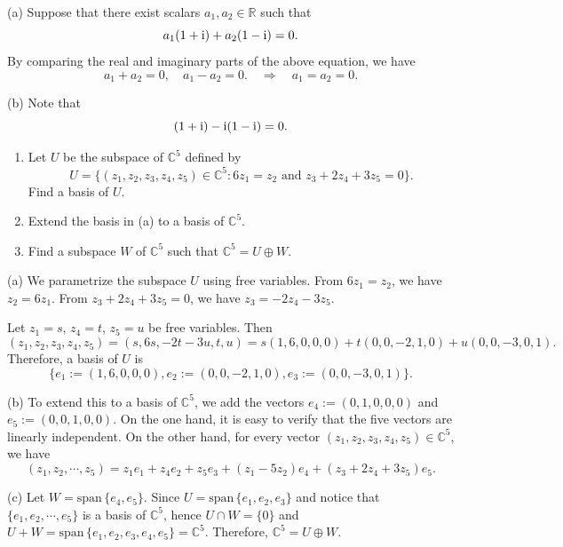 \documentclass{article}
\newcommand{\sspan}{\text{span}\,}
\begin{document}
\begin{solution}
    (a) Suppose that there exist scalars \( a_1, a_2 \in \mathbb{R} \) such that
    \[ a_1 (1 + \mathrm{i}) + a_2 (1 - \mathrm{i}) = 0. \]
    By comparing the real and imaginary parts of the above equation, we have
    \[ a_1+a_2=0,\quad a_1-a_2=0.\quad\Rightarrow\quad a_1=a_2=0. \]\par 
    (b) Note that
    \[ (1+\mathrm{i}) -\mathrm{i} (1-\mathrm{i})=0. \]
\end{solution}

\begin{problem}[2B-4]
    \begin{enumerate}[label=(\alph*)]
        \item Let \( U \) be the subspace of \( \mathbb{C}^5 \) defined by
        \[
        U = \{ (z_1, z_2, z_3, z_4, z_5) \in \mathbb{C}^5 : 6z_1 = z_2 \text{ and } z_3 + 2z_4 + 3z_5 = 0 \}.
        \]
        Find a basis of \( U \).

        \item Extend the basis in (a) to a basis of \( \mathbb{C}^5 \).

        \item Find a subspace \( W \) of \( \mathbb{C}^5 \) such that \( \mathbb{C}^5 = U \oplus W \).
    \end{enumerate}
\end{problem}

\begin{solution}
    (a) We parametrize the subspace $U$ using free variables. From $6z_1 = z_2$, we have $z_2 = 6z_1$. From $z_3 + 2z_4 + 3z_5 = 0$, we have $z_3 = -2z_4 - 3z_5$. 

Let $z_1 = s$, $z_4 = t$, $z_5 = u$ be free variables. Then
\[ (z_1, z_2, z_3, z_4, z_5) = (s, 6s, -2t - 3u, t, u) = s(1, 6, 0, 0, 0) + t(0, 0, -2, 1, 0) + u(0, 0, -3, 0, 1). \]
Therefore, a basis of $U$ is
\[ \{ e_1:=(1, 6, 0, 0, 0), e_2:=(0, 0, -2, 1, 0), e_3:=(0, 0, -3, 0, 1) \}. \]

    (b) To extend this to a basis of $\mathbb{C}^5$, we add the vectors $e_4:=(0, 1, 0, 0, 0)$ and $e_5:=(0, 0, 1, 0, 0)$. On the one hand, it is easy to verify that the five vectors are linearly independent. On the other hand, for every vector $(z_1, z_2, z_3, z_4, z_5) \in \mathbb{C}^5$, we have
    \[ (z_1,z_2,\cdots,z_5)=z_1e_1+z_4e_2+z_5e_3+(z_1-5z_2)e_4+(z_3+2z_4+3z_5)e_5. \] 

    (c) Let $W = \sspan\{ e_4,e_5 \}$. Since $ U=\sspan\{e_1,e_2,e_3\} $ and notice that $ \{e_1,e_2,\cdots,e_5\} $ is a basis of $ \mathbb{C}^5 $, hence $ U\cap W=\{0\} $ and $ U+W=\sspan\{e_1,e_2,e_3,e_4,e_5\} = \mathbb{C}^5 $. Therefore, $ \mathbb{C}^5=U\oplus W $.
\end{solution}
\end{document}
